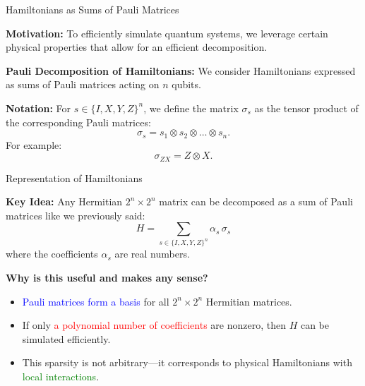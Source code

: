 \documentclass[aspectratio=169,xcolor=dvipsnames]{beamer}
\begin{document}
\begin{frame}{Hamiltonians as Sums of Pauli Matrices}

\textbf{Motivation:}  
To efficiently simulate quantum systems, we leverage certain physical properties that allow for an efficient decomposition.

\medskip

\textbf{Pauli Decomposition of Hamiltonians:}  
We consider Hamiltonians expressed as sums of Pauli matrices acting on \( n \) qubits.

\medskip

\textbf{Notation:}  
For \( s \in \{I, X, Y, Z\}^n \), we define the matrix \( \sigma_s \) as the tensor product of the corresponding Pauli matrices:
\[
\sigma_s = s_1 \otimes s_2 \otimes \dots \otimes s_n.
\]
For example:
\[
\sigma_{ZX} = Z \otimes X.
\]

\end{frame}


\begin{frame}{Representation of Hamiltonians}

\textbf{Key Idea:} Any Hermitian \(2^n \times 2^n\) matrix can be decomposed as a sum of Pauli matrices like we previously said:
\[
H = \sum_{s \in \{I, X, Y, Z\}^n} \alpha_s\, \sigma_s
\]
where the coefficients \(\alpha_s\) are real numbers.

\bigskip

\textbf{Why is this useful and makes any sense?}
\begin{itemize}
    \item \textcolor{blue}{Pauli matrices form a basis} for all \(2^n \times 2^n\) Hermitian matrices.
    \item If only \textcolor{red}{a polynomial number of coefficients} are nonzero, then \(H\) can be simulated efficiently.
    \item This sparsity is not arbitrary—it corresponds to physical Hamiltonians with \textcolor{green}{local interactions}.
\end{itemize}

\end{frame}
\end{document}

